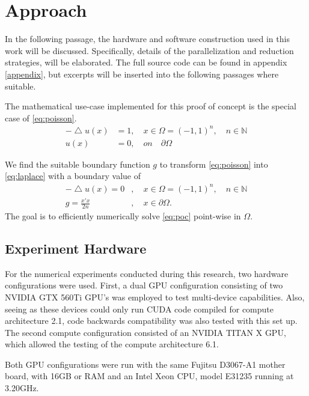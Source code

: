 \chapter{Approach}
\label{chapter:approach}

In the following passage, the hardware and software construction used
in this work will be discussed.  Specifically, details of the parallelization and
reduction strategies, will be elaborated.  The full source code can be found in
appendix \ref{appendix}, but excerpts will be inserted into the following passages
where suitable.
\par

The mathematical use-case implemented for this proof of concept is the special case of \eqref{eq:poisson}.
\begin{equation}
  \begin{aligned}
  -\bigtriangleup u(x) &= 1,\quad x \in \Omega = (-1,1)^n, \quad n \in \mathbb{N}\\
  u(x) &= 0,\quad on \quad \partial \Omega
\end{aligned}
\end{equation}

We find the suitable boundary function $g$ to transform \eqref{eq:poisson} into \eqref{eq:laplace}
with a boundary value of
 \begin{equation}
   \begin{aligned}
     -\bigtriangleup u(x) = 0&, \quad x \in \Omega = (-1,1)^n, \quad n \in \mathbb{N}\\
   g = \frac{x'x}{2n}&, \quad x \in \partial \Omega.
   \label{eq:poc}
 \end{aligned}
   \end{equation}
The goal is to efficiently numerically solve \eqref{eq:poc} point-wise in $\Omega$.

\section{Experiment Hardware}
For the numerical experiments conducted during this research, two hardware configurations
were used.  First, a dual GPU configuration consisting of two NVIDIA GTX 560Ti GPU's was
employed to test multi-device capabilities. Also, seeing as these devices
could only run \Gls{CUDA} code compiled for compute architecture 2.1, code
backwards compatibility was also tested with this set up.
The second compute configuration consisted of an NVIDIA TITAN X GPU, which allowed
the testing of the compute architecture 6.1.
\par
Both \Gls{GPU} configurations were run with the same Fujitsu D3067-A1 mother board,
with 16GB or RAM and an Intel Xeon CPU, model E31235 running at 3.20GHz.

